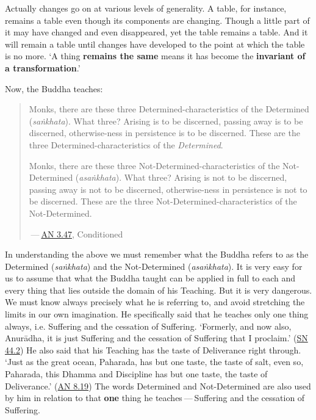 Actually changes go on at various levels of generality. A table, for instance, remains a table even though its components are changing. Though a little part of it may have changed and even disappeared, yet the table remains a table. And it will remain a table until changes have developed to the point at which the table is no more. `A thing \textbf{remains the same} means it has become the \textbf{invariant of a transformation}.'

Now, the Buddha teaches:

\begin{quote}
Monks, there are these three Determined-characteristics of the Determined (\emph{saṅkhata}). What three? Arising is to be discerned, passing away is to be discerned, otherwise-ness in persistence is to be discerned. These are the three Determined-characteristics of the \emph{Determined}.

Monks, there are these three Not-Determined-characteristics of the Not-Determined (\emph{asaṅkhata}). What three? Arising is not to be discerned, passing away is not to be discerned, otherwise-ness in persistence is not to be discerned. These are the three Not-Determined-characteristics of the Not-Determined.

 --- \href{https://suttacentral.net/an3.47/en/bodhi}{AN 3.47}, Conditioned
\end{quote}

In understanding the above we must remember what the Buddha refers to as the Determined (\emph{saṅkhata}) and the Not-Determined (\emph{asaṅkhata}). It is very easy for us to assume that what the Buddha taught can be applied in full to each and every thing that lies outside the domain of his Teaching. But it is very dangerous. We must know always precisely what he is referring to, and avoid stretching the limits in our own imagination. He specifically said that he teaches only one thing always, i.e. Suffering and the cessation of Suffering. `Formerly, and now also, Anurādha, it is just Suffering and the cessation of Suffering that I proclaim.' (\href{https://suttacentral.net/sn44.2/en/sujato}{SN 44.2}) He also said that his Teaching has the taste of Deliverance right through. `Just as the great ocean, Paharada, has but one taste, the taste of salt, even so, Paharada, this Dhamma and Discipline has but one taste, the taste of Deliverance.' (\href{https://suttacentral.net/an8.19/en/bodhi}{AN 8.19}) The words Determined and Not-Determined are also used by him in relation to that \textbf{one} thing he teaches --- Suffering and the cessation of Suffering.

